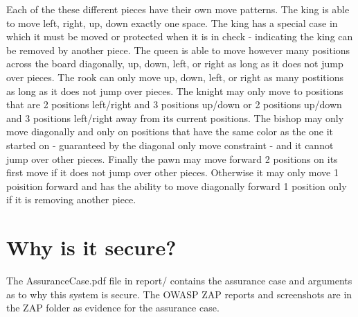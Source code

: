 \documentclass[12pt]{article}
\begin{document}
Each of the these different pieces have their own move patterns. The king is able to move left, right, up, down exactly one space. The king has a special case in which it must be moved or protected when it is in check - indicating the king can be removed by another piece. The queen is able to move however many positions across the board diagonally, up, down, left, or right as long as it does not jump over pieces. The rook can only move up, down, left, or right as many postitions as long as it does not jump over pieces. The knight may only move to positions that are 2 positions left/right and 3 positions up/down or 2 positions up/down and 3 positions left/right away from its current positions. The bishop may only move diagonally and only on positions that have the same color as the one it started on - guaranteed by the diagonal only move constraint - and it cannot jump over other pieces. Finally the pawn may move forward 2 positions on its first move if it does not jump over other pieces. Otherwise it may only move 1 poisition forward and has the ability to move diagonally forward 1 position only if it is removing another piece.

\section{Why is it secure?}
The AssuranceCase.pdf file in report/ contains the assurance case and arguments as to why this system is secure. The OWASP ZAP reports and screenshots are in the ZAP folder as evidence for the assurance case.
\end{document}

